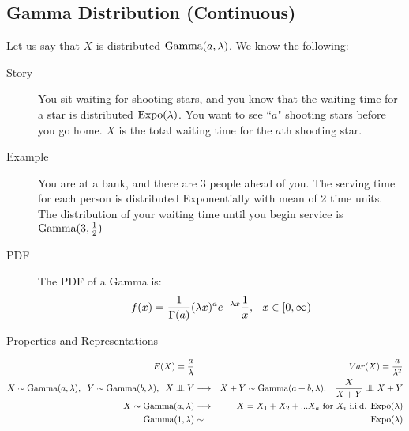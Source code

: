 \documentclass[11.5pt]{article}
\begin{document}
\begin{notes}
\section*{Gamma Distribution (Continuous)}
Let us say that $X$ is distributed $\textrm{Gamma}(a, \lambda)$. We know the following:
\begin{description}
	\item[Story] You sit waiting for shooting stars, and you know that the waiting time for a star is distributed $\textrm{Expo}(\lambda)$. You want to see ``$a$" shooting stars before you go home. $X$ is the total waiting time for the $a$th shooting star.
	\item[Example]	You are at a bank, and there are 3 people ahead of you. The serving time for each person is distributed Exponentially with mean of 2 time units. The distribution of your waiting time until you begin service is $\textrm{Gamma}(3, \frac{1}{2})$
	\item[PDF] The PDF of a Gamma is:
\begin{eqnarray*}
f(x) = \frac{1}{\Gamma(a)}(\lambda x)^ae^{-\lambda x}\frac{1}{x},
\hspace{.1 in}
x \in [0, \infty)
\end{eqnarray*}
	\item[Properties and Representations]
\end{description}
\vspace{-.4 cm}
	\begin{eqnarray*}
		E(X) = \frac{a}{\lambda} && Var(X) = \frac{a}{\lambda^2} \\
		X \sim \Gam(a, \lambda), \hspace{.2 cm} Y \sim \Gam(b, \lambda), \hspace{.2cm} X \independent Y &\longrightarrow& X + Y \sim \Gam(a + b, \lambda), \hspace{.3cm} \frac{X}{X + Y} \independent X + Y \\
		X \sim \Gam(a, \lambda) &\longrightarrow& X = X_1 + X_2 + ... X_a \textnormal{ for $X_i$ i.i.d. $\Expo(\lambda)$} \\
		\Gam(1, \lambda) &\sim& \Expo(\lambda) 
	\end{eqnarray*}

\pagebreak


\end{notes}
\end{document}

